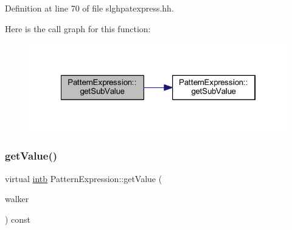 Definition at line 70 of file slghpatexpress.\+hh.

Here is the call graph for this function\+:
\nopagebreak
\begin{figure}[H]
\begin{center}
\leavevmode
\includegraphics[width=322pt]{class_pattern_expression_a0842ac84a9b84a426730ddaf1ef1e509_cgraph}
\end{center}
\end{figure}
\mbox{\label{class_pattern_expression_a8332c6ea4c5a7e9dfc690df2a6458bb8}} 
\subsubsection{\texorpdfstring{getValue()}{getValue()}}
{\footnotesize\ttfamily virtual \mbox{\hyperlink{types_8h_aa925ba3e627c2df89d5b1cfe84fb8572}{intb}} Pattern\+Expression\+::get\+Value (\begin{DoxyParamCaption}\item[{\mbox{\hyperlink{class_parser_walker}{Parser\+Walker}} \&}]{walker }\end{DoxyParamCaption}) const\hspace{0.3cm}{\ttfamily [pure virtual]}}



